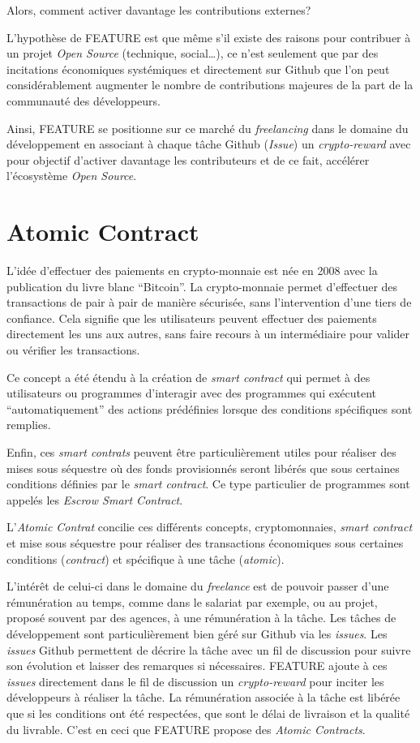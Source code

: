 \documentclass[
	a4paper, %
	10pt, %
	unnumberedsections, %
	twoside, %
]{LTJournalArticle}
\begin{document}
Alors, comment activer davantage les contributions externes?

L'hypothèse de FEATURE est que même s'il existe des raisons pour contribuer à un projet \emph{Open Source} (technique, social\ldots), ce n'est seulement que par des incitations économiques systémiques et directement sur Github que l'on peut considérablement augmenter le nombre de contributions majeures de la part de la communauté des développeurs.

Ainsi, FEATURE se positionne sur ce marché du \emph{freelancing} dans le domaine du développement en associant à chaque tâche Github (\emph{Issue}) un \emph{crypto-reward} avec pour objectif d'activer davantage les contributeurs et de ce fait, accélérer l'écosystème \emph{Open Source}.


\section{Atomic Contract}

L'idée d'effectuer des paiements en crypto-monnaie est née en 2008 avec la publication du livre blanc ``Bitcoin''. La crypto-monnaie permet d'effectuer des transactions de pair à pair de manière sécurisée, sans l'intervention d'une tiers de confiance. Cela signifie que les utilisateurs peuvent effectuer des paiements directement les uns aux autres, sans faire recours à un intermédiaire pour valider ou vérifier les transactions.

Ce concept a été étendu à la création de \emph{smart contract} qui permet à des utilisateurs ou programmes d'interagir avec des programmes qui exécutent ``automatiquement'' des actions prédéfinies lorsque des conditions spécifiques sont remplies.

Enfin, ces \emph{smart contrats} peuvent être particulièrement utiles pour réaliser des mises sous séquestre où des fonds provisionnés seront libérés que sous certaines conditions définies par le \emph{smart contract}. Ce type particulier de programmes sont appelés les \emph{Escrow Smart Contract}.

L'\emph{Atomic Contrat} concilie ces différents concepts, cryptomonnaies, \emph{smart contract} et mise sous séquestre pour réaliser des transactions économiques sous certaines conditions (\emph{contract}) et spécifique à une tâche (\emph{atomic}).

L'intérêt de celui-ci dans le domaine du \emph{freelance} est de pouvoir passer d'une rémunération au temps, comme dans le salariat par exemple, ou au projet, proposé souvent par des agences, à une rémunération à la tâche. Les tâches de développement sont particulièrement bien géré sur Github via les \emph{issues}. Les \emph{issues} Github permettent de décrire la tâche avec un fil de discussion pour suivre son évolution et laisser des remarques si nécessaires. FEATURE ajoute à ces \emph{issues} directement dans le fil de discussion un \emph{crypto-reward} pour inciter les développeurs à réaliser la tâche. La rémunération associée à la tâche est libérée que si les conditions ont été respectées, que sont le délai de livraison et la qualité du livrable. C'est en ceci que FEATURE propose des \emph{Atomic Contracts}.
\end{document}
